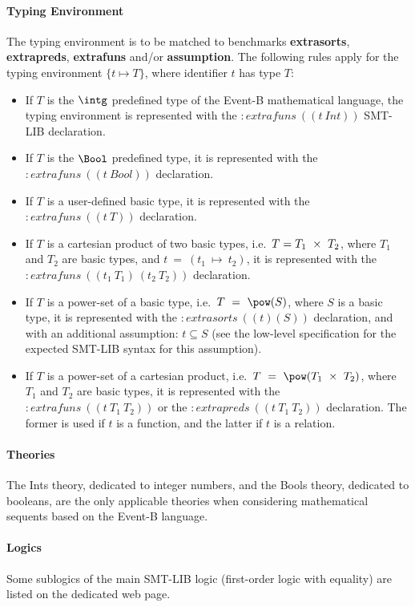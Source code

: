 \paragraph{Typing Environment}
The typing environment is to be matched to benchmarks \textbf{extrasorts}, \textbf{extrapreds}, \textbf{extrafuns} and/or \textbf{assumption}. The following rules apply for the typing environment $\{t \mapsto T\}$, where identifier $t$ has type $T$:
\begin{itemize}
\item If $T$ is the $\intg$ predefined type of the Event-B 
mathematical language, the typing environment is represented 
with the  $:extrafuns~((t~Int))$ SMT-LIB declaration.
\item If $T$ is the $\Bool$ predefined type, it is
represented with the $:extrafuns~((t~Bool))$ declaration.
\item If $T$ is a user-defined basic type, it is represented
with the $:extrafuns~((t~T))$ declaration.
\item If $T$ is a cartesian product of two basic types, i.e.\
$T = T_1~\mathbin\times~T_2$, where $T_1$ and $T_2$ are basic types,
and $t~=~(t_1~\mapsto~t_2)$, it is represented with the 
$:extrafuns~((t_1~T_1)~(t_2~T_2))$ declaration.
\item If $T$ is a power-set of a basic type, i.e.\
$T~=~\pow(S)$, where $S$ is a basic type, it is represented 
with the $:extrasorts~((t) (S))$ declaration, and with an
additional assumption: $t \subseteq S$ (see the low-level
specification for the expected SMT-LIB syntax for this 
assumption).
\item If $T$ is a power-set of a cartesian product, i.e.\
$T~=~\pow(T_1~\cprod~T_2)$, where $T_1$ and $T_2$ are basic
types, it is represented with the $:extrafuns~((t~T_1~T_2))$ 
or the $:extrapreds~((t~T_1~T_2))$ declaration. The former
is used if $t$ is a function, and the latter if $t$ is a 
relation.
\end{itemize}

\paragraph{Theories}
The Ints theory, dedicated to integer numbers, and the Bools theory, dedicated to booleans, are the only applicable theories when considering mathematical  sequents based on the Event-B language. 

\paragraph{Logics}
Some sublogics of the main SMT-LIB logic (first-order logic with equality) are listed on the dedicated web page\cite{SMTLIB}.

